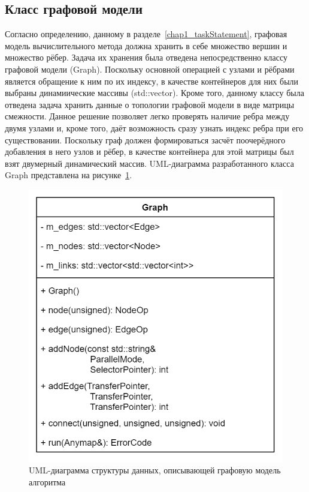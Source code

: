 \subsection{Класс графовой модели}
Согласно определению, данному в разделе~\ref{chap1_taskStatement}, графовая модель вычислительного метода должна хранить в себе множество вершин и множество рёбер. Задача их хранения была отведена непосредственно классу графовой модели (\textsf{Graph}). Поскольку основной операцией с узлами и рёбрами является обращение к ним по их индексу, в качестве контейнеров для них были выбраны динамиические массивы (\textsf{std::vector}). Кроме того, данному классу была отведена задача хранить данные о топологии графовой модели в виде матрицы смежности. Данное решение позволяет легко проверять наличие ребра между двумя узлами и, кроме того, даёт возможность сразу узнать индекс ребра при его существовании. Поскольку граф должен формироваться засчёт поочерёдного добавления в него узлов и рёбер, в качестве контейнера для этой матрицы был взят двумерный динамический массив. UML-диаграмма разработанного класса \textsf{Graph} представлена на рисунке~\ref{fig:UMLGraph}.

\begin{figure}[!ht]
    \centering
    \includegraphics[height=0.33\textheight]{figures/class.graph.png}
    \caption{UML-диаграмма структуры данных, описывающей графовую модель алгоритма}
    \label{fig:UMLGraph}
\end{figure}

